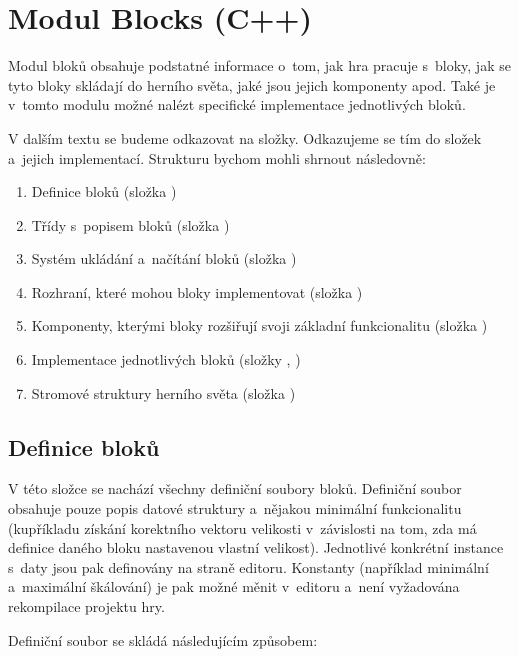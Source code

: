 
\section{Modul Blocks (C++)}

Modul bloků obsahuje podstatné informace o~tom, jak hra pracuje s~bloky, jak se tyto bloky skládají do herního světa, jaké jsou jejich komponenty apod. Také je v~tomto modulu možné nalézt specifické implementace jednotlivých bloků.

V dalším textu se budeme odkazovat na složky. Odkazujeme se tím do složek  a~jejich  implementací. Strukturu bychom mohli shrnout následovně:

\begin{enumerate}
	\item Definice bloků (složka )
	\item Třídy s~popisem bloků (složka )
	\item Systém ukládání a~načítání bloků (složka )
	\item Rozhraní, které mohou bloky implementovat (složka )
	\item Komponenty, kterými bloky rozšiřují svoji základní funkcionalitu (složka )
	\item Implementace jednotlivých bloků (složky , )
	\item Stromové struktury herního světa (složka )
\end{enumerate}
 

\subsection{Definice bloků}
V této složce se nachází všechny definiční soubory bloků. Definiční soubor obsahuje pouze popis datové struktury a~nějakou minimální funkcionalitu (kupříkladu získání korektního vektoru velikosti v~závislosti na tom, zda má definice daného bloku nastavenou vlastní velikost). Jednotlivé konkrétní instance s~daty jsou pak definovány na straně editoru. Konstanty (například minimální a~maximální škálování) je pak možné měnit v~editoru a~není vyžadována rekompilace projektu hry. 

Definiční soubor se skládá následujícím způsobem:

